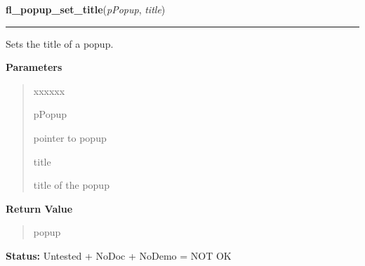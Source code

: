 \hspace{.8\funcindent}\begin{boxedminipage}{\funcwidth}

    \raggedright \textbf{fl\_popup\_set\_title}(\textit{pPopup}, \textit{title})

    \vspace{-1.5ex}

    \rule{\textwidth}{0.5\fboxrule}
\setlength{\parskip}{2ex}
    Sets the title of a popup.

\setlength{\parskip}{1ex}
      \textbf{Parameters}
      \vspace{-1ex}

      \begin{quote}
        \begin{Ventry}{xxxxxx}

          \item[pPopup]

          pointer to popup

          \item[title]

          title of the popup

        \end{Ventry}

      \end{quote}

      \textbf{Return Value}
    \vspace{-1ex}

      \begin{quote}
      popup

      \end{quote}

\textbf{Status:} Untested + NoDoc + NoDemo = NOT OK



    \end{boxedminipage}

    \label{xformslib:library:fl_popup_entry_set_callback}

    \vspace{0.5ex}

